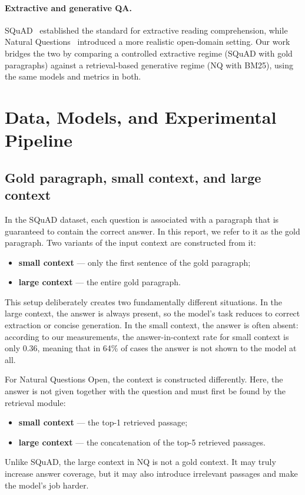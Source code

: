\documentclass[a4paper,12pt]{article}
\begin{document}
\paragraph{Extractive and generative QA.}
SQuAD~\cite{squad} established the standard for extractive reading comprehension, while Natural Questions~\cite{nq} introduced a more realistic open-domain setting. Our work bridges the two by comparing a controlled extractive regime (SQuAD with gold paragraphs) against a retrieval-based generative regime (NQ with BM25), using the same models and metrics in both.

\section{Data, Models, and Experimental Pipeline}
\subsection{Gold paragraph, small context, and large context}
In the SQuAD dataset, each question is associated with a paragraph that is guaranteed to contain the correct answer. In this report, we refer to it as the gold paragraph. Two variants of the input context are constructed from it:
\begin{itemize}
    \item \textbf{small context} — only the first sentence of the gold paragraph;
    \item \textbf{large context} — the entire gold paragraph.
\end{itemize}
This setup deliberately creates two fundamentally different situations. In the large context, the answer is always present, so the model’s task reduces to correct extraction or concise generation. In the small context, the answer is often absent: according to our measurements, the answer-in-context rate for small context is only 0.36, meaning that in 64\% of cases the answer is not shown to the model at all.

For Natural Questions Open, the context is constructed differently. Here, the answer is not given together with the question and must first be found by the retrieval module:
\begin{itemize}
    \item \textbf{small context} — the top-1 retrieved passage;
    \item \textbf{large context} — the concatenation of the top-5 retrieved passages.
\end{itemize}
Unlike SQuAD, the large context in NQ is not a gold context. It may truly increase answer coverage, but it may also introduce irrelevant passages and make the model’s job harder.
\end{document}
